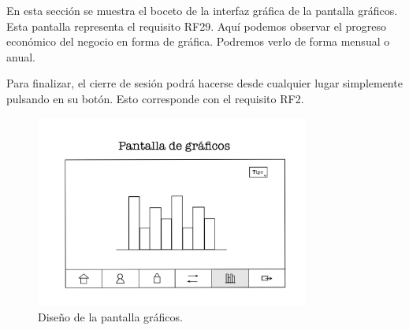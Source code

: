 En esta sección se muestra el boceto de la interfaz gráfica de la pantalla gráficos. Esta pantalla representa el requisito RF29. Aquí podemos observar el progreso económico del negocio en forma de gráfica. Podremos verlo de forma mensual o anual. 

Para finalizar, el cierre de sesión podrá hacerse desde cualquier lugar simplemente pulsando en su botón. Esto corresponde con el requisito RF2. 


\begin{figure}[ht]
	\centering
	\includegraphics[width=0.8\textwidth, angle=270]{imagenes/pantalla_graficos.JPG}
	\caption{Diseño de la pantalla gráficos.}
	\label{fig:pantallagraficos}
\end{figure}